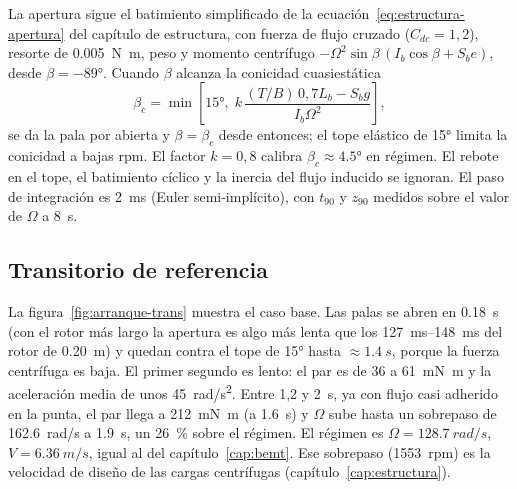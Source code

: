 La apertura sigue el batimiento simplificado de la ecuación~\eqref{eq:estructura-apertura}
del capítulo de estructura, con fuerza de flujo cruzado ($C_{dc}=1{,}2$), resorte de
\SI{0.005}{N.m}, peso y momento centrífugo $-\Omega^2\sin\beta\,(I_b\cos\beta+S_be)$, desde
$\beta=\ang{-89}$. Cuando $\beta$ alcanza la conicidad cuasiestática
\begin{equation}
  \beta_c=\min\!\left[\ang{15},\;k\,\frac{(T/B)\,0{,}7L_b-S_bg}{I_b\Omega^2}\right],
  \label{eq:arranque-cono}
\end{equation}
se da la pala por abierta y $\beta=\beta_c$ desde entonces; el tope elástico de \ang{+15}
limita la conicidad a bajas rpm. El factor $k=0{,}8$ calibra $\beta_c\approx\ang{4.5}$ en
régimen. El rebote en el tope, el batimiento cíclico y la inercia del flujo inducido se
ignoran. El paso de integración es \SI{2}{ms} (Euler semi-implícito), con $t_{90}$ y
$z_{90}$ medidos sobre el valor de $\Omega$ a \SI{8}{s}.

\subsection{Transitorio de referencia}

La figura~\ref{fig:arranque-trans} muestra el caso base. Las palas se abren en
\SI{0.18}{s} (con el rotor más largo la apertura es algo más lenta que los
\SIrange{127}{148}{ms} del rotor de \SI{0.20}{m}) y quedan contra el tope de \ang{15} hasta
$\approx\SI{1.4}{s}$, porque la fuerza centrífuga es baja. El primer segundo es lento: el
par es de 36 a \SI{61}{mN.m} y la aceleración media de unos \SI{45}{rad/s^2}. Entre 1,2 y
\SI{2}{s}, ya con flujo casi adherido en la punta, el par llega a \SI{212}{mN.m} (a
\SI{1.6}{s}) y $\Omega$ sube hasta un sobrepaso de \SI{162.6}{rad/s} a \SI{1.9}{s}, un
\SI{26}{\percent} sobre el régimen. El régimen es $\Omega=\SI{128.7}{rad/s}$,
$V=\SI{6.36}{m/s}$, igual al del capítulo~\ref{cap:bemt}. Ese sobrepaso (\num{1553}~rpm)
es la velocidad de diseño de las cargas centrífugas (capítulo~\ref{cap:estructura}).


